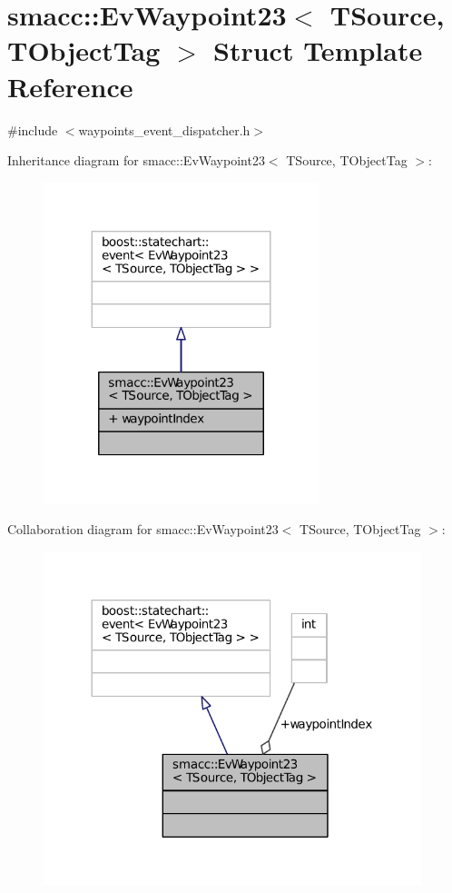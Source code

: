 \hypertarget{structsmacc_1_1EvWaypoint23}{}\section{smacc\+:\+:Ev\+Waypoint23$<$ T\+Source, T\+Object\+Tag $>$ Struct Template Reference}
\label{structsmacc_1_1EvWaypoint23}


{\ttfamily \#include $<$waypoints\+\_\+event\+\_\+dispatcher.\+h$>$}



Inheritance diagram for smacc\+:\+:Ev\+Waypoint23$<$ T\+Source, T\+Object\+Tag $>$\+:
\nopagebreak
\begin{figure}[H]
\begin{center}
\leavevmode
\includegraphics[width=227pt]{structsmacc_1_1EvWaypoint23__inherit__graph}
\end{center}
\end{figure}


Collaboration diagram for smacc\+:\+:Ev\+Waypoint23$<$ T\+Source, T\+Object\+Tag $>$\+:
\nopagebreak
\begin{figure}[H]
\begin{center}
\leavevmode
\includegraphics[width=312pt]{structsmacc_1_1EvWaypoint23__coll__graph}
\end{center}
\end{figure}
